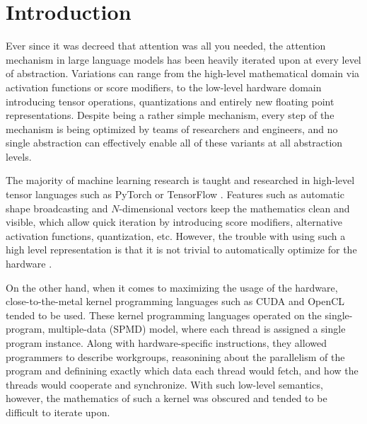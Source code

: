 \documentclass[review, anonymous, acmsmall]{acmart}
\begin{document}

\fi

\maketitle

\section{Introduction}

Ever since it was decreed that attention was all you needed, the attention mechanism in large language models has been heavily iterated upon at every level of abstraction. Variations can range from the high-level mathematical domain via activation functions or score modifiers, to the low-level hardware domain introducing tensor operations, quantizations and entirely new floating point representations. Despite being a rather simple mechanism, every step of the mechanism is being optimized by teams of researchers and engineers, and no single abstraction can effectively enable all of these variants at all abstraction levels.

The majority of machine learning research is taught and researched in high-level tensor languages such as PyTorch or TensorFlow
. Features such as automatic shape broadcasting and $N$-dimensional vectors keep the mathematics clean and visible, which allow quick iteration by introducing score modifiers, alternative activation functions, quantization, etc. However, the trouble with using such a high level representation is that it is not trivial to automatically optimize for the hardware 
.

On the other hand, when it comes to maximizing the usage of the hardware, close-to-the-metal kernel programming languages such as CUDA and OpenCL tended to be used. These kernel programming languages operated on the single-program, multiple-data (SPMD) model, where each thread is assigned a single program instance. Along with hardware-specific instructions, they allowed programmers to describe workgroups, reasonining about the parallelism of the program and definining exactly which data each thread would fetch, and how the threads would cooperate and synchronize. With such low-level semantics, however, the mathematics of such a kernel was obscured and tended to be difficult to iterate upon.
\end{document}
